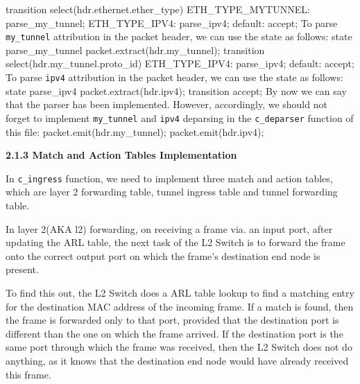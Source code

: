 \documentclass{article}%
\newenvironment{code}%
   {\snugshade\verbatim}%
   {\endverbatim\endsnugshade}
\begin{document}
\begin{Large}
\begin{code}
{        transition select(hdr.ethernet.ether_type) {
            ETH_TYPE_MYTUNNEL: parse_my_tunnel;
            ETH_TYPE_IPV4: parse_ipv4;
            default: accept;
        }
    }
\end{code}
To parse \texttt{my\_tunnel} attribution in the packet header, we can use the state as follows:
\newpage
\begin{code}
    state parse_my_tunnel {
        packet.extract(hdr.my_tunnel);
        transition select(hdr.my_tunnel.proto_id) {
            ETH_TYPE_IPV4: parse_ipv4;
            default: accept;
        }
    }
\end{code}
To parse \texttt{ipv4} attribution in the packet header, we can use the state as follows:
\begin{code}
    state parse_ipv4 {
        packet.extract(hdr.ipv4);
        transition accept;
    }
\end{code}
By now we can say that the parser has been implemented. However, accordingly, we should not forget to implement \texttt{my\_tunnel} and \texttt{ipv4} deparsing in the \texttt{c\_deparser} function of this file:
\begin{code}
    packet.emit(hdr.my_tunnel);
    packet.emit(hdr.ipv4);
\end{code}

\begin{flushleft}
\begin{Large}
\textbf{2.1.3 Match and Action Tables Implementation}
\end{Large}
\end{flushleft}

In \texttt{c\_ingress} function, we need to implement three match and action tables, which are layer 2 forwarding table, tunnel ingress table and tunnel forwarding table.

In layer 2(AKA l2) forwarding, on receiving a frame via. an input port, after updating the ARL table, the next task of the L2 Switch is to forward the frame onto the correct output port on which the frame’s destination end node is present. 

To find this out, the L2 Switch does a ARL table lookup to find a matching entry for  the destination MAC address of the incoming frame. If a match is found, then the frame is forwarded only to that port, provided that the destination port is different than the one on which the frame arrived. If the destination port is the same port through which the frame was received, then the L2 Switch does not do anything, as it knows that the destination end node would have already received this frame.


\end{Large}
\end{document}
